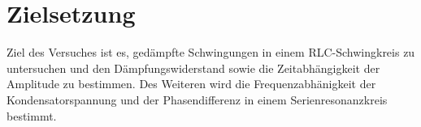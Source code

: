 \section{Zielsetzung}
\label{sec:Zielsetzung}
Ziel des Versuches ist es, gedämpfte Schwingungen in einem RLC-Schwingkreis zu
untersuchen und den Dämpfungswiderstand sowie die Zeitabhängigkeit der Amplitude
zu bestimmen. Des Weiteren wird die Frequenzabhänigkeit der Kondensatorspannung
und der Phasendifferenz in einem Serienresonanzkreis bestimmt.
